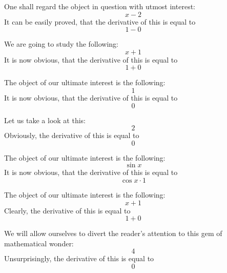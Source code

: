 \documentclass{article}
\begin{document}
One shall regard the object in question with utmost interest:
\begin{equation}
x - 2 
\end{equation}
It can be easily proved, that the derivative of this is equal to
\begin{equation}
1 - 0 
\end{equation}

We are going to study the following:
\begin{equation}
x + 1 
\end{equation}
It is now obvious, that the derivative of this is equal to
\begin{equation}
1 + 0 
\end{equation}

The object of our ultimate interest is the following:
\begin{equation}
1 
\end{equation}
It is now obvious, that the derivative of this is equal to
\begin{equation}
0 
\end{equation}

Let us take a look at this:
\begin{equation}
2 
\end{equation}
Obviously, the derivative of this is equal to
\begin{equation}
0 
\end{equation}

The object of our ultimate interest is the following:
\begin{equation}
\sin x 
\end{equation}
It is now obvious, that the derivative of this is equal to
\begin{equation}
\cos x \cdot 1 
\end{equation}

The object of our ultimate interest is the following:
\begin{equation}
x + 1 
\end{equation}
Clearly, the derivative of this is equal to
\begin{equation}
1 + 0 
\end{equation}

We will allow ourselves to divert the reader's attention to this gem of mathematical wonder:
\begin{equation}
4 
\end{equation}
Unsurprisingly, the derivative of this is equal to
\begin{equation}
0 
\end{equation}
\end{document}
